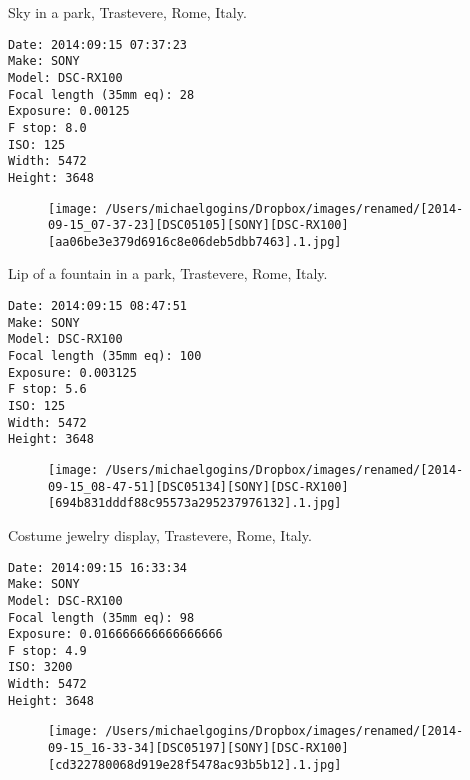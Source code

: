 \documentclass[11pt,letter,DIV=14,paper=landscape]{scrbook}
\begin{document}
\clearpage
\noindent Sky in a park, Trastevere, Rome, Italy.
\noindent
\begin{lstlisting}
Date: 2014:09:15 07:37:23
Make: SONY
Model: DSC-RX100
Focal length (35mm eq): 28
Exposure: 0.00125
F stop: 8.0
ISO: 125
Width: 5472
Height: 3648
\end{lstlisting}
\clearpage

\begin{figure}
\texttt{[image: /Users/michaelgogins/Dropbox/images/renamed/[2014-09-15\_07-37-23][DSC05105][SONY][DSC-RX100][aa06be3e379d6916c8e06deb5dbb7463].1.jpg]}
\end{figure}
    
\clearpage
\noindent Lip of a fountain in a park, Trastevere, Rome, Italy.
\noindent
\begin{lstlisting}
Date: 2014:09:15 08:47:51
Make: SONY
Model: DSC-RX100
Focal length (35mm eq): 100
Exposure: 0.003125
F stop: 5.6
ISO: 125
Width: 5472
Height: 3648
\end{lstlisting}
\clearpage

\begin{figure}
\texttt{[image: /Users/michaelgogins/Dropbox/images/renamed/[2014-09-15\_08-47-51][DSC05134][SONY][DSC-RX100][694b831dddf88c95573a295237976132].1.jpg]}
\end{figure}
    
\clearpage
\noindent Costume jewelry display, Trastevere, Rome, Italy.
\noindent
\begin{lstlisting}
Date: 2014:09:15 16:33:34
Make: SONY
Model: DSC-RX100
Focal length (35mm eq): 98
Exposure: 0.016666666666666666
F stop: 4.9
ISO: 3200
Width: 5472
Height: 3648
\end{lstlisting}
\clearpage

\begin{figure}
\texttt{[image: /Users/michaelgogins/Dropbox/images/renamed/[2014-09-15\_16-33-34][DSC05197][SONY][DSC-RX100][cd322780068d919e28f5478ac93b5b12].1.jpg]}
\end{figure}
    
\end{document}
